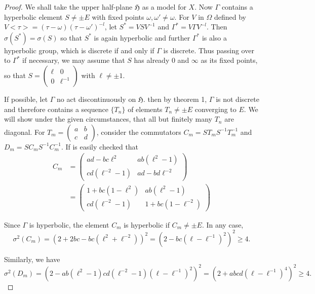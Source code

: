 \begin{proof}
We shall take the upper half-plane $\mathfrak{H}$ as a model for
$X$. Now $\Gamma$ contains a hyperbolic element $S\neq \pm E$ with
fixed points $\omega, \omega' \neq \omega$. For $V$ in $\Omega$
defined by $V<\tau>=(\tau - \omega) (\tau-\omega')^{-l}$, let
$S^{\ast}=VSV^{-1}$ and $\Gamma^{\ast}=V\Gamma V^{-l}$. Then
$\sigma(S^{\ast}) =\sigma(S)$ so that $S^{\ast}$ is again hyperbolic
and further $\Gamma^{\ast}$ is also a hyperbolic group, which is
discrete if and only if $\Gamma$ is discrete. Thus passing over to
$\Gamma^{\ast}$ if necessary, we may assume that \pageoriginale $S$
has already 0 and $\infty$ as its fixed points, so that
$S=\begin{pmatrix}
\ell & 0 \\
0 & \ell^{-1}
\end{pmatrix}$ with $\ell \neq \pm 1$.

If possible, let $\Gamma$ no act discontinuously on
$\mathfrak{H}$. then by theorem 1, $\Gamma$ is not discrete and
therefore contains a sequence $\{T_n\}$ of elements $T_n \neq \pm E$
converging to $E$. We will show under the given circumstances, that
all but finitely many $T_n$ are diagonal. For $T_m = \begin{pmatrix}
a&b\\
c&d
\end{pmatrix}$, consider the commutators $C_m = ST_m S^{-1} T^{-1}_m$
and $D_m = SC_m S^{-1}C^{-1}_m$. If is easily checked that 
\begin{align*}
C_m & = \begin{pmatrix}
ad-bc \ell^2 & ab (\ell^2-1)\\
cd (\ell^{-2}-1) & ad-bd\ell^{-2}
\end{pmatrix}\\
& = \begin{pmatrix}
1+bc(1-\ell^2) & ab(\ell^2-1)\\
cd (\ell^{-2}-1) & 1+bc (1-\ell^{-2})
\end{pmatrix}
\end{align*}

Since $\Gamma$ is hyperbolic, the element $C_m$ is hyperbolic if $C_m
\neq \pm E$. In any case, 
$$ 
\sigma^2(C_m) = (2+2bc - bc (\ell^2 + \ell^{-2}))^2 = (2-bc
(\ell-\ell^{-1})^2)^2 \geq 4.
$$

Similarly, we have  
$$
\sigma^2(D_m) = (2-ab(\ell^2-1) cd (\ell^{-2}-1) (\ell-\ell^{-1})^2)^2
= (2+abcd (\ell-\ell^{-1})^4)^2 \geq 4.
$$


\end{proof}
